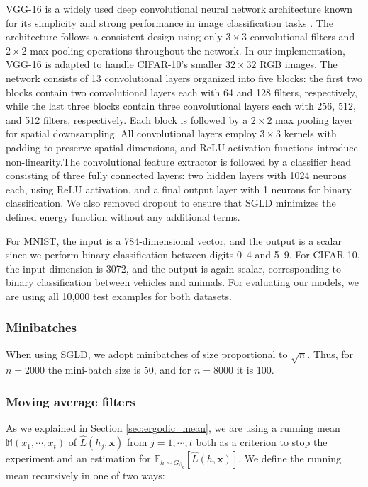 \documentclass{article} %
\begin{document}
VGG-16 is a widely used deep convolutional neural network architecture known for its simplicity and strong performance in image classification tasks \citep{simonyan2014very}. 
The architecture follows a consistent design using only \(3 \times 3\) convolutional filters and \(2 \times 2\) max pooling operations throughout the network. In our implementation, VGG-16 is adapted to handle CIFAR-10's smaller \(32 \times 32\) RGB images.  The network consists of 13 convolutional layers organized into five blocks: 
the first two blocks contain two convolutional layers each with 64 and 128 filters, respectively, while the last three blocks contain three convolutional layers each with 256, 512, and 512 filters, respectively. 
Each block is followed by a \(2 \times 2\) max pooling layer for spatial downsampling. All convolutional layers employ \(3 \times 3\) kernels with padding to preserve spatial dimensions, and ReLU activation functions introduce non-linearity.The convolutional feature extractor is followed by a classifier head consisting of three fully connected layers: two hidden layers with 1024 neurons each, using ReLU activation, and a final output layer with 1 neurons for binary classification. We also removed dropout to ensure that SGLD minimizes the defined energy function without any additional terms.

For MNIST, the input is a 784-dimensional vector, and the output is a scalar since we perform binary classification between digits 0--4 and 5--9. For CIFAR-10, the input dimension is 3072, and the output is again scalar, corresponding to binary classification between vehicles and animals. For evaluating our models, we are using all 10,000 test examples for both datasets.

\subsubsection{Minibatches} 
When using SGLD, we adopt minibatches of size proportional to $\sqrt{n}$. Thus, for $n=2000$ the mini-batch size is 50, and for $n=8000$ it is 100.
\subsubsection{Moving average filters} \label{sec:mov_avg}
As we explained in Section \ref{sec:ergodic_mean}, we are using a running mean $\mathbb{M}(x_1, \cdots, x_t)$ of $\hat{L}(h_j, \mathbf{x})$ from $j = 1, \cdots, t$ both as a criterion to stop the experiment and an estimation for $\mathbb{E}_{h\sim G_{\beta _{k}}}\left[ \hat{L}\left( h,\mathbf{x}\right) %
\right] $. We define the running mean recursively in one of two ways:
\end{document}
